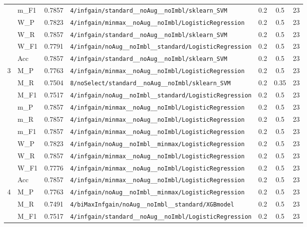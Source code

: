 \begin{table}[htbp]
\begin{tabular}{|c|l|c|>{\ttfamily\footnotesize}p{7.2cm}|c|c|c|}
 & m\_F1 & 0.7857 & \texttt{4/infgain/standard\_\_noAug\_\_noImbl/sklearn\_SVM} & 0.2 & 0.5  & 23 \\ 
 & W\_P & 0.7823 & \texttt{4/infgain/minmax\_\_noAug\_\_noImbl/LogisticRegression} & 0.2 & 0.5  & 23 \\ 
 & W\_R & 0.7857 & \texttt{4/infgain/standard\_\_noAug\_\_noImbl/sklearn\_SVM} & 0.2 & 0.5  & 23 \\ 
 & W\_F1 & 0.7791 & \texttt{4/infgain/noAug\_\_noImbl\_\_standard/LogisticRegression} & 0.2 & 0.5  & 23 \\ 
 & Acc & 0.7857 & \texttt{4/infgain/standard\_\_noAug\_\_noImbl/sklearn\_SVM} & 0.2 & 0.5  & 23 \\ 
\hline
\multirow{10}{*}{3} & M\_P & 0.7763 & \texttt{4/infgain/minmax\_\_noAug\_\_noImbl/LogisticRegression} & 0.2 & 0.5  & 23 \\ 
 & M\_R & 0.7504 & \texttt{8/noSelect/standard\_\_noAug\_\_noImbl/sklearn\_SVM} & 0.2 & 0.35  & 23 \\ 
 & M\_F1 & 0.7517 & \texttt{4/infgain/noAug\_\_noImbl\_\_standard/LogisticRegression} & 0.2 & 0.5  & 23 \\ 
 & m\_P & 0.7857 & \texttt{4/infgain/minmax\_\_noAug\_\_noImbl/LogisticRegression} & 0.2 & 0.5  & 23 \\ 
 & m\_R & 0.7857 & \texttt{4/infgain/minmax\_\_noAug\_\_noImbl/LogisticRegression} & 0.2 & 0.5  & 23 \\ 
 & m\_F1 & 0.7857 & \texttt{4/infgain/minmax\_\_noAug\_\_noImbl/LogisticRegression} & 0.2 & 0.5  & 23 \\ 
 & W\_P & 0.7823 & \texttt{4/infgain/noAug\_\_noImbl\_\_minmax/LogisticRegression} & 0.2 & 0.5  & 23 \\ 
 & W\_R & 0.7857 & \texttt{4/infgain/minmax\_\_noAug\_\_noImbl/LogisticRegression} & 0.2 & 0.5  & 23 \\ 
 & W\_F1 & 0.7776 & \texttt{4/infgain/minmax\_\_noAug\_\_noImbl/LogisticRegression} & 0.2 & 0.5  & 23 \\ 
 & Acc & 0.7857 & \texttt{4/infgain/minmax\_\_noAug\_\_noImbl/LogisticRegression} & 0.2 & 0.5  & 23 \\ 
\hline
\multirow{10}{*}{4} & M\_P & 0.7763 & \texttt{4/infgain/noAug\_\_noImbl\_\_minmax/LogisticRegression} & 0.2 & 0.5  & 23 \\ 
 & M\_R & 0.7491 & \texttt{4/biMaxInfgain/noAug\_\_noImbl\_\_standard/XGBmodel} & 0.2 & 0.5  & 23 \\ 
 & M\_F1 & 0.7517 & \texttt{4/infgain/standard\_\_noAug\_\_noImbl/LogisticRegression} & 0.2 & 0.5  & 23 \\ 

\end{tabular}
\end{table}
